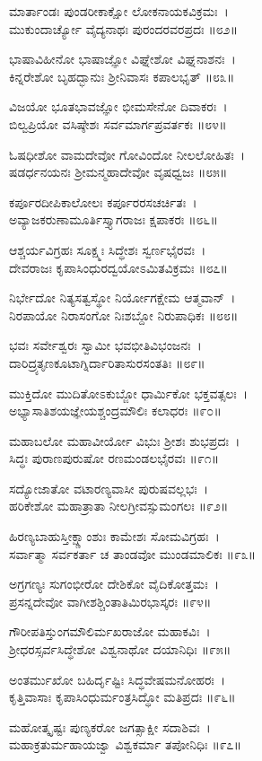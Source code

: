ಮಾರ್ತಾಂಡಃ ಪುಂಡರೀಕಾಕ್ಷೋ ಲೋಕನಾಯಕವಿಕ್ರಮಃ~।\\
ಮುಕುಂದಾರ್ಚ್ಯೋ ವೈದ್ಯನಾಥಃ ಪುರಂದರವರಪ್ರದಃ ॥೮೨॥

	ಭಾಷಾವಿಹೀನೋ ಭಾಷಾಜ್ಞೋ ವಿಘ್ನೇಶೋ ವಿಘ್ನನಾಶನಃ~।\\
	ಕಿನ್ನರೇಶೋ ಬೃಹದ್ಭಾನುಃ ಶ್ರೀನಿವಾಸಃ ಕಪಾಲಭೃತ್ ॥೮೩॥

ವಿಜಯೋ ಭೂತಭಾವಜ್ಞೋ ಭೀಮಸೇನೋ ದಿವಾಕರಃ~।\\
ಬಿಲ್ವಪ್ರಿಯೋ ವಸಿಷ್ಠೇಶಃ ಸರ್ವಮಾರ್ಗಪ್ರವರ್ತಕಃ ॥೮೪॥

	ಓಷಧೀಶೋ ವಾಮದೇವೋ ಗೋವಿಂದೋ ನೀಲಲೋಹಿತಃ~।\\
	ಷಡರ್ಧನಯನಃ ಶ್ರೀಮನ್ಮಹಾದೇವೋ ವೃಷಧ್ವಜಃ ॥೮೫॥

ಕರ್ಪೂರದೀಪಿಕಾಲೋಲಃ ಕರ್ಪೂರರಸಚರ್ಚಿತಃ~।\\
ಅವ್ಯಾಜಕರುಣಾಮೂರ್ತಿಸ್ತ್ಯಾಗರಾಜಃ ಕ್ಷಪಾಕರಃ ॥೮೬॥

	ಆಶ್ಚರ್ಯವಿಗ್ರಹಃ ಸೂಕ್ಷ್ಮಃ ಸಿದ್ಧೇಶಃ ಸ್ವರ್ಣಭೈರವಃ~।\\
	ದೇವರಾಜಃ ಕೃಪಾಸಿಂಧುರದ್ವಯೋಽಮಿತವಿಕ್ರಮಃ ॥೮೭॥

ನಿರ್ಭೇದೋ ನಿತ್ಯಸತ್ವಸ್ಥೋ ನಿರ್ಯೋಗಕ್ಷೇಮ ಆತ್ಮವಾನ್~।\\
ನಿರಪಾಯೋ ನಿರಾಸಂಗೋ ನಿಃಶಬ್ದೋ ನಿರುಪಾಧಿಕಃ ॥೮೮॥

	ಭವಃ ಸರ್ವೇಶ್ವರಃ ಸ್ವಾಮೀ ಭವಭೀತಿವಿಭಂಜನಃ~।\\
	ದಾರಿದ್ರ್ಯತೃಣಕೂಟಾಗ್ನಿರ್ದಾರಿತಾಸುರಸಂತತಿಃ ॥೮೯॥

ಮುಕ್ತಿದೋ ಮುದಿತೋಽಕುಬ್ಜೋ ಧಾರ್ಮಿಕೋ ಭಕ್ತವತ್ಸಲಃ~।\\
ಅಭ್ಯಾಸಾತಿಶಯಜ್ಞೇಯಶ್ಚಂದ್ರಮೌಲಿಃ ಕಲಾಧರಃ ॥೯೦॥

	ಮಹಾಬಲೋ ಮಹಾವೀರ್ಯೋ ವಿಭುಃ ಶ್ರೀಶಃ ಶುಭಪ್ರದಃ~।\\
	ಸಿದ್ಧಃ ಪುರಾಣಪುರುಷೋ ರಣಮಂಡಲಭೈರವಃ ॥೯೧॥

ಸದ್ಯೋಜಾತೋ ವಟಾರಣ್ಯವಾಸೀ ಪುರುಷವಲ್ಲಭಃ~।\\
ಹರಿಕೇಶೋ ಮಹಾತ್ರಾತಾ ನೀಲಗ್ರೀವಸ್ಸುಮಂಗಲಃ ॥೯೨॥

	ಹಿರಣ್ಯಬಾಹುಸ್ತೀಕ್ಷ್ಣಾಂಶುಃ ಕಾಮೇಶಃ ಸೋಮವಿಗ್ರಹಃ~।\\
	ಸರ್ವಾತ್ಮಾ ಸರ್ವಕರ್ತಾ ಚ ತಾಂಡವೋ ಮುಂಡಮಾಲಿಕಃ ॥೯೩॥

ಅಗ್ರಗಣ್ಯಃ ಸುಗಂಭೀರೋ ದೇಶಿಕೋ ವೈದಿಕೋತ್ತಮಃ~।\\
ಪ್ರಸನ್ನದೇವೋ ವಾಗೀಶಶ್ಚಿಂತಾತಿಮಿರಭಾಸ್ಕರಃ ॥೯೪॥

	ಗೌರೀಪತಿಸ್ತುಂಗಮೌಲಿರ್ಮಖರಾಜೋ ಮಹಾಕವಿಃ~।\\
	ಶ್ರೀಧರಸ್ಸರ್ವಸಿದ್ಧೇಶೋ ವಿಶ್ವನಾಥೋ ದಯಾನಿಧಿಃ ॥೯೫॥

ಅಂತರ್ಮುಖೋ ಬಹಿರ್ದೃಷ್ಟಿಃ ಸಿದ್ಧವೇಷಮನೋಹರಃ~।\\
ಕೃತ್ತಿವಾಸಾಃ ಕೃಪಾಸಿಂಧುರ್ಮಂತ್ರಸಿದ್ಧೋ ಮತಿಪ್ರದಃ ॥೯೬॥

	ಮಹೋತ್ಕೃಷ್ಟಃ ಪುಣ್ಯಕರೋ ಜಗತ್ಸಾಕ್ಷೀ ಸದಾಶಿವಃ~।\\
	ಮಹಾಕ್ರತುರ್ಮಹಾಯಜ್ವಾ ವಿಶ್ವಕರ್ಮಾ ತಪೋನಿಧಿಃ ॥೯೭॥

